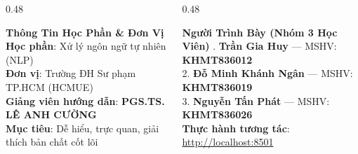 \documentclass[aspectratio=169, 10pt]{beamer}
\begin{document}
{\begin{frame}[plain]
  \vspace{0.15cm}
  \begin{columns}[T, onlytextwidth]
    \begin{column}{0.48\textwidth}
      \begin{block}{\small\textbf{Thông Tin Học Phần \& Đơn Vị}}
        \fontsize{8}{10.5}\selectfont
        \textbf{Học phần}: Xử lý ngôn ngữ tự nhiên (NLP)\\
        \textbf{Đơn vị}: Trường ĐH Sư phạm TP.HCM (HCMUE)\\
        \textbf{Giảng viên hướng dẫn}: \textbf{\color{HCMUEDarkBlue}PGS.TS. LÊ ANH CƯỜNG}\\
        \textbf{Mục tiêu}: Dễ hiểu, trực quan, giải thích bản chất cốt lõi
      \end{block}
    \end{column}
    \hfill
    \begin{column}{0.48\textwidth}
      \begin{block}{\small\textbf{Người Trình Bày (Nhóm 3 Học Viên)}}
        \fontsize{8}{10.5}. \textbf{Trần Gia Huy} — MSHV: \textbf{KHMT836012}\\
        2. \textbf{Đỗ Minh Khánh Ngân} — MSHV: \textbf{KHMT836019}\\
        3. \textbf{Nguyễn Tấn Phát} — MSHV: \textbf{KHMT836026}\\
        \textbf{Thực hành tương tác}: \url{http://localhost:8501}
      \end{block}
    \end{column}
  \end{columns}
\end{frame}
}
\end{document}

